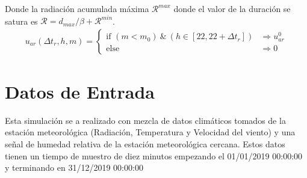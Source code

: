 \documentclass{article}
\newcommand{\R}{\mathcal{R}}
\begin{document}
Donde la radiación acumulada máxima  $\R^{max}$ donde el valor de la duración se satura es $\R= d_{max}/\beta + \R^{min}$.
\begin{gather}
    u_{ar}(\Delta t_r,h,m) = \begin{cases}
            \text{if } (m < m_0) \ \& \ (h \in [22,22+\Delta t_r]) & \Rightarrow u_{ar}^0 \\
            \text{else}  & \Rightarrow 0 
    \end{cases}
\end{gather}



\section{Datos de Entrada}

Esta simulación se a realizado con mezcla de datos climáticos tomados de la estación meteorológica (Radiación, Temperatura y Velocidad del viento) y una señal de humedad relativa de la estación meteorológica cercana. Estos datos tienen un tiempo de muestro de diez minutos empezando el 01/01/2019 00:00:00 y terminando en 31/12/2019 00:00:00





\end{document}
